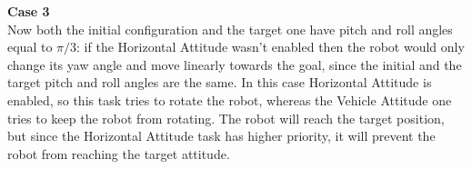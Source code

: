 \documentclass{article}
\begin{document}
\begin{figure}[H]
	\centering
	\hspace{10mm}
	\label{fig:q2case2cd}
\end{figure}

{\large \textbf{Case 3}} \\
Now both the initial configuration and the target one have pitch and roll angles equal to $ \pi/3 $: if the Horizontal Attitude wasn't enabled then the robot would only change its yaw angle and move linearly towards the goal, since the initial and the target pitch and roll angles are the same. In this case Horizontal Attitude is enabled, so this task tries to rotate the robot, whereas the Vehicle Attitude one tries to keep the robot from rotating. The robot will reach the target position, but since the Horizontal Attitude task has higher priority, it will prevent the robot from reaching the target attitude.
\end{document}
